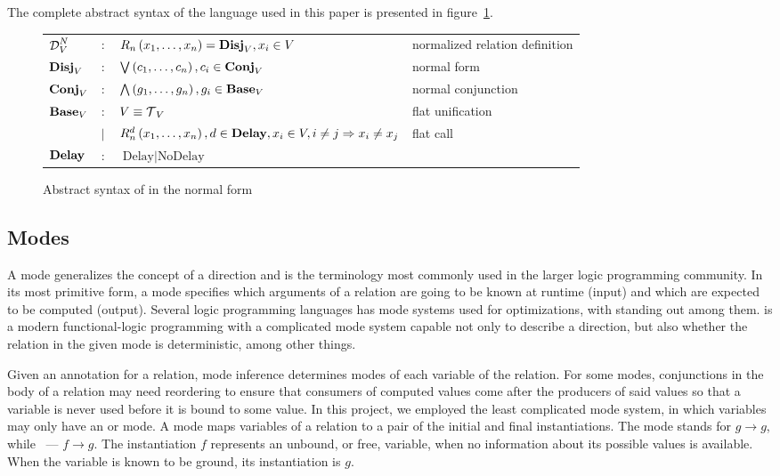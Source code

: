 The complete abstract syntax of the \mk language used in this paper is presented in figure~\ref{fig:miniKanren}.

\begin{figure}[h]
    \begin{tabular}{llll}
     $\operatorname{\mathcal{D}}_{V}^N$ & $:$ & $R_{n}\left( x_1, \ldots, x_{n} \right) = \operatorname{\mathbf{Disj}}_{V}, x_{i}\in V$ & normalized relation definition \\
    $\operatorname{\mathbf{Disj}}_{V}$ & $:$ & $\bigvee\left( c_1, \ldots, c_{n} \right), c_{i}\in \operatorname{\mathbf{Conj}}_{V}$ & normal form \\
    $\operatorname{\mathbf{Conj}}_{V}$ & $:$ & $\bigwedge\left( g_1, \ldots, g_n \right), g_{i}\in \operatorname{\mathbf{Base}}_{V}$ & normal conjunction \\
    $\operatorname{\mathbf{Base}}_{V}$ & $:$ & $V \equiv \operatorname{\mathcal{T}}_{V}$ & flat unification \\
                & $\mid$ & $R_{n}^{d}\left( x_1, \ldots, x_{n} \right), d\in \operatorname{\mathbf{Delay}}, x_{i}\in V, i \neq j \Rightarrow x_i \neq x_j$ & flat call\\

    $\operatorname{\mathbf{Delay}}$ & $:$ &  $\text{Delay} \mid \text{NoDelay} $ &
    \end{tabular}
    \caption{Abstract syntax of \mk in the normal form}
    \label{fig:miniKanren}
\end{figure}

\subsection{Modes}

A mode generalizes the concept of a direction and is the terminology most commonly used in the larger logic programming community.
In its most primitive form, a mode specifies which arguments of a relation are going to be known at runtime (input) and which are expected to be computed (output).
Several logic programming languages has mode systems used for optimizations, with \merc standing out among them.
\merc is a modern functional-logic programming with a complicated mode system capable not only to describe a direction, but also whether the relation in the given mode is deterministic, among other things.

Given an annotation for a relation, mode inference determines modes of each variable of the relation.
For some modes, conjunctions in the body of a relation may need reordering to ensure that consumers of computed values come after the producers of said values so that a variable is never used before it is bound to some value.
In this project, we employed the least complicated mode system, in which variables may only have an \inm or \outm mode.
A mode maps variables of a relation to a pair of the initial and final instantiations.
The mode \inm stands for $g \rightarrow g$, while \outm~--- $f \rightarrow g$.
The instantiation $f$ represents an unbound, or free, variable, when no information about its possible values is available.
When the variable is known to be ground, its instantiation is $g$.

